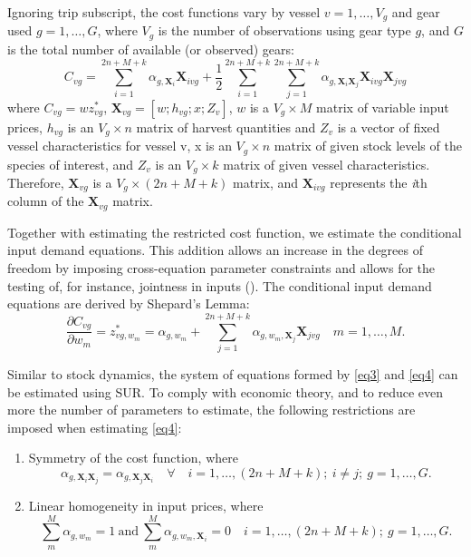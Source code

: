\documentclass[
  11pt,
]{article}
\begin{document}
Ignoring trip subscript, the cost functions vary by vessel
\(v=1,\ldots,V_g\) and gear used \(g=1,\ldots,G\), where \(V_g\) is the
number of observations using gear type \(g\), and \(G\) is the total
number of available (or observed) gears: \begin{equation}
C_{vg} = \sum_{i=1}^{2n+M+k} \alpha_{g, \mathbf{X}_i} \mathbf{X}_{ivg} + \frac{1}{2} \sum_{i=1}^{2n+M+k} \sum_{j=1}^{2n+M+k} \alpha_{g, \mathbf{X}_i\mathbf{X}_j} \mathbf{X}_{ivg} \mathbf{X}_{jvg}
\label{eq3}
\end{equation} where \(C_{vg}= w z_{vg}^*\),
\(\mathbf{X}_{vg}=[w;h_{vg};x;Z_v]\), \(w\) is a \(V_g \times M\) matrix
of variable input prices, \(h_{vg}\) is an \(V_g \times n\) matrix of
harvest quantities and \(Z_v\) is a vector of fixed vessel
characteristics for vessel v, x is an \(V_g \times n\) matrix of given
stock levels of the species of interest, and \(Z_v\) is an
\(V_g \times k\) matrix of given vessel characteristics. Therefore,
\(\mathbf{X}_{vg}\) is a \(V_g \times (2n+M+k)\) matrix, and
\(\mathbf{X}_{ivg}\) represents the \emph{i}th column of the
\(\mathbf{X}_{vg}\) matrix.

Together with estimating the restricted cost function, we estimate the
conditional input demand equations. This addition allows an increase in
the degrees of freedom by imposing cross-equation parameter constraints
and allows for the testing of, for instance, jointness in inputs
(). The conditional
input demand equations are derived by Shepard's Lemma: \begin{equation}
\frac{\partial C_{vg}}{\partial w_m} = z^*_{vg,w_m} = \alpha_{g,w_m} + \sum_{j=1}^{2n+M+k} \alpha_{g,w_m,\mathbf{X}_j} \mathbf{X}_{jvg} \quad m=1,\ldots,M.
\label{eq4}
\end{equation}

Similar to stock dynamics, the system of equations formed by \eqref{eq3}
and \eqref{eq4} can be estimated using SUR. To comply with economic
theory, and to reduce even more the number of parameters to estimate,
the following restrictions are imposed when estimating \eqref{eq4}:

\begin{enumerate}
\def\labelenumi{\arabic{enumi}.}
\item
  Symmetry of the cost function, where \begin{equation*}
    \alpha_{g,\mathbf{X}_i\mathbf{X}_j} = \alpha_{g,\mathbf{X}_j\mathbf{X}_i} \quad \forall \quad i=1,\ldots,(2n + M + k); \ i \neq j; \ g = 1,\ldots, G.
    \end{equation*}
\item
  Linear homogeneity in input prices, where \begin{equation*}
    \sum_m^M \alpha_{g,w_m} = 1 \ \text{and} \ \sum_m^M \alpha_{g,w_m,\mathbf{X}_i} = 0 \quad i=1,\ldots,(2n + M + k); \ g = 1,\ldots, G.
    \end{equation*}
\end{enumerate}
\end{document}
